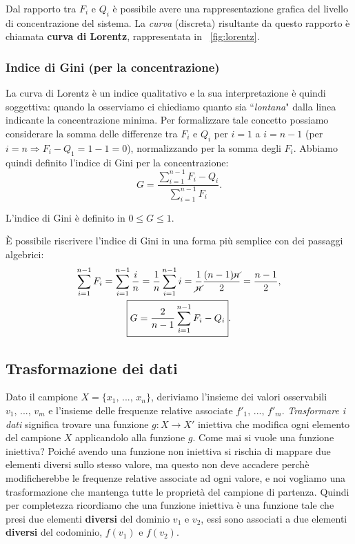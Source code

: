\noindent Dal rapporto tra $F_i$ e $Q_i$ è possibile avere una rappresentazione grafica del livello di concentrazione del sistema. La \textit{curva} (discreta) risultante da questo rapporto è chiamata \textbf{curva di Lorentz}, rappresentata in \figurename \ \ref{fig:lorentz}.

\subsubsection{Indice di Gini (per la concentrazione)}
La curva di Lorentz è un indice qualitativo e la sua interpretazione è quindi soggettiva: quando la osserviamo ci chiediamo quanto sia ``\textit{lontana}" dalla linea indicante la concentrazione minima. Per formalizzare tale concetto possiamo considerare la somma delle differenze tra $F_i$ e $Q_i$ per $i=1$ a $i=n-1$ (per $i=n \Rightarrow F_i-Q_1=1-1=0$), normalizzando per la somma degli $F_i$. Abbiamo quindi definito l'indice di Gini per la concentrazione:
\[
\boxed{
G = \frac{\displaystyle \sum_{i=1}^{n-1}  F_i - Q_i}{\displaystyle \sum_{i=1}^{n-1} F_i}
}.
\]

\noindent L'indice di Gini è definito in $\boxed{0 \leq G \leq 1}$.

\noindent È possibile riscrivere l'indice di Gini in una forma più semplice con dei passaggi algebrici: 
\begin{gather*}
\sum_{i=1}^{n-1} F_i = \sum_{i=1}^{n-1} \frac in = \frac 1n \sum_{i=1}^{n-1} i = \frac {1}{\cancel n} \frac {(n-1) \cancel n}2 = \frac{n-1}2,
\\
\boxed{
G = \frac{2}{n-1} \sum_{i=1}^{n-1} F_i - Q_i}.
\end{gather*}

\subsection{Trasformazione dei dati}
Dato il campione $X= \{x_1, \, ..., \, x_n\}$, deriviamo l'insieme dei valori osservabili $v_1, \, ..., \, v_m$ e l'insieme delle frequenze relative associate $f'_1, \, ..., \, f'_m$. 
\textit{Trasformare i dati} significa trovare una funzione $g: X \rightarrow X'$ iniettiva che modifica ogni elemento del campione $X$ applicandolo alla funzione $g$. 
Come mai si vuole una funzione iniettiva? Poiché avendo una funzione non iniettiva si rischia di mappare due elementi diversi sullo stesso valore, ma questo non deve accadere perchè modificherebbe le frequenze relative associate ad ogni valore, e noi vogliamo una trasformazione che mantenga tutte le proprietà del campione di partenza.
Quindi per completezza ricordiamo che una funzione iniettiva è una funzione tale che presi due elementi \textbf{diversi} del dominio $v_1$ e $v_2$, essi sono associati a due elementi \textbf{diversi} del codominio, $f(v_1)$ e $f(v_2)$.

